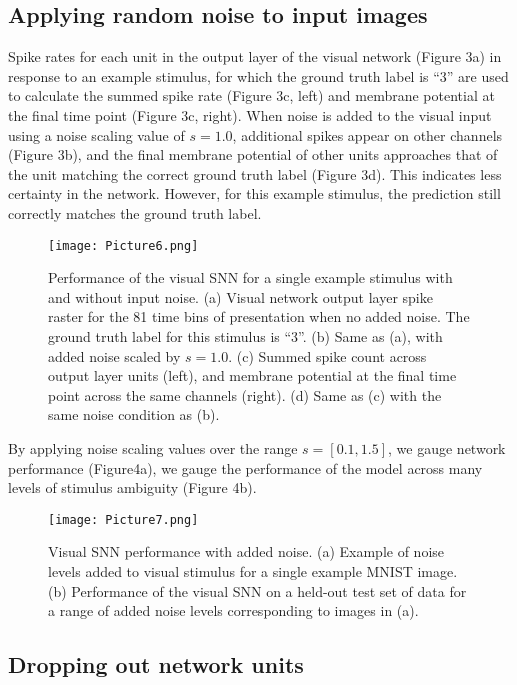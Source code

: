 \documentclass[conference]{IEEEtran}
\begin{document}
\subsection{Applying random noise to input images}

Spike rates for each unit in the output layer of the visual network (Figure 3a) in response to an example stimulus, for which the ground truth label is ``3''  are used to calculate the summed spike rate (Figure 3c, left) and membrane potential at the final time point (Figure 3c, right). When noise is added to the visual input using a noise scaling value of $s=1.0$, additional spikes appear on other channels (Figure 3b), and the final membrane potential of other units approaches that of the unit matching the correct ground truth label (Figure 3d). This indicates less certainty in the network. However, for this example stimulus, the prediction still correctly matches the ground truth label.

\begin{figure}[htbp]
\centerline{\texttt{[image: Picture6.png]}}
\caption{Performance of the visual SNN for a single example stimulus with and without input noise. (a) Visual network output layer spike raster for the 81 time bins of presentation when no added noise. The ground truth label for this stimulus is ``3''. (b) Same as (a), with added noise scaled by $s=1.0$. (c) Summed spike count across output layer units (left), and membrane potential at the final time point across the same channels (right). (d) Same as (c) with the same noise condition as (b).}
\label{fig}
\end{figure}

By applying noise scaling values over the range $s=[0.1,1.5]$, we gauge network performance (Figure4a), we gauge the performance of the model across many levels of stimulus ambiguity (Figure 4b).

\begin{figure}[htbp]
\centerline{\texttt{[image: Picture7.png]}}
\caption{Visual SNN performance with added noise. (a) Example of noise levels added to visual stimulus for a single example MNIST image. (b) Performance of the visual SNN on a held-out test set of data for a range of added noise levels corresponding to images in (a).}
\label{fig}
\end{figure}

\subsection{Dropping out network units}
\end{document}
